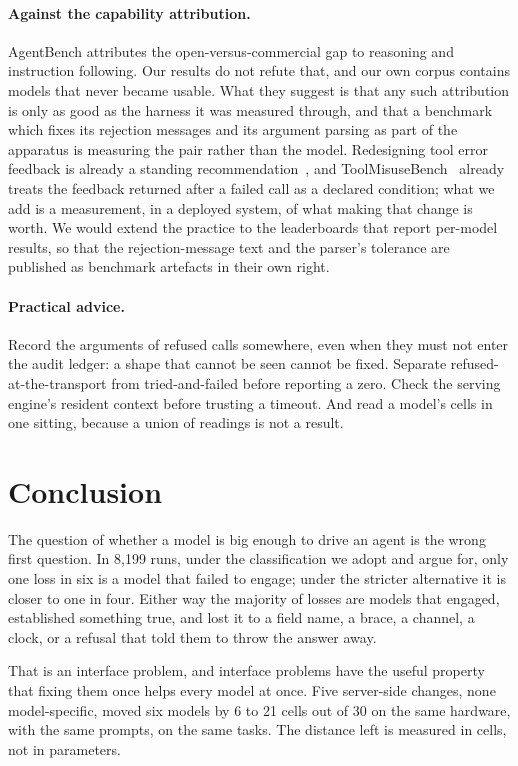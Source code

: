 \documentclass[11pt]{article}
\begin{document}
\paragraph{Against the capability attribution.}
AgentBench attributes the open-versus-commercial gap to reasoning and instruction following. Our results do not
refute that, and our own corpus contains models that never became usable. What they suggest is that any such
attribution is only as good as the harness it was measured through, and that a benchmark which fixes its
rejection messages and its argument parsing as part of the apparatus is measuring the pair rather than the model.
Redesigning tool error feedback is already a standing recommendation~\cite{xiong2025butterfly}, and
ToolMisuseBench~\cite{sigdel2026toolmisuse} already treats the feedback returned after a failed call as a
declared condition; what we add is a measurement, in a deployed system, of what making that change is worth. We
would extend the practice to the leaderboards that report per-model results, so that the rejection-message text
and the parser's tolerance are published as benchmark artefacts in their own right.

\paragraph{Practical advice.}
Record the arguments of refused calls somewhere, even when they must not enter the audit ledger: a shape that
cannot be seen cannot be fixed. Separate refused-at-the-transport from tried-and-failed before reporting a zero.
Check the serving engine's resident context before trusting a timeout. And read a model's cells in one sitting,
because a union of readings is not a result.

\section{Conclusion}

The question of whether a model is big enough to drive an agent is the wrong first question. In 8{,}199 runs,
under the classification we adopt and argue for, only one loss in six is a model that failed to engage; under the
stricter alternative it is closer to one in four. Either way the majority of losses are models that engaged,
established something true, and lost it to a field name, a brace, a channel, a clock, or a refusal that told them
to throw the answer away.

That is an interface problem, and interface problems have the useful property that fixing them once helps every
model at once. Five server-side changes, none model-specific, moved six models by 6 to 21 cells out of 30 on the
same hardware, with the same prompts, on the same tasks. The distance left is measured in cells, not in
parameters.
\end{document}
